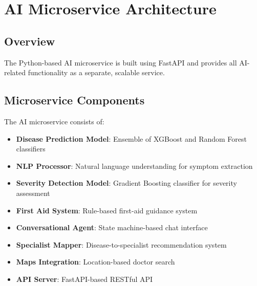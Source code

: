 \documentclass[12pt,a4paper]{article}
\begin{document}
\section{AI Microservice Architecture}

\subsection{Overview}
The Python-based AI microservice is built using FastAPI and provides all AI-related functionality as a separate, scalable service.

\subsection{Microservice Components}
The AI microservice consists of:

\begin{itemize}
    \item \textbf{Disease Prediction Model}: Ensemble of XGBoost and Random Forest classifiers
    \item \textbf{NLP Processor}: Natural language understanding for symptom extraction
    \item \textbf{Severity Detection Model}: Gradient Boosting classifier for severity assessment
    \item \textbf{First Aid System}: Rule-based first-aid guidance system
    \item \textbf{Conversational Agent}: State machine-based chat interface
    \item \textbf{Specialist Mapper}: Disease-to-specialist recommendation system
    \item \textbf{Maps Integration}: Location-based doctor search
    \item \textbf{API Server}: FastAPI-based RESTful API
\end{itemize}
\end{document}
